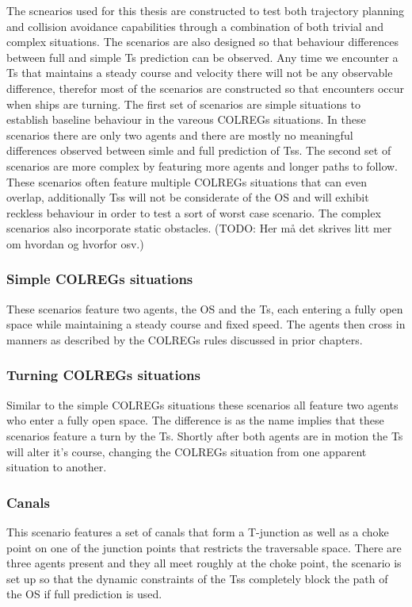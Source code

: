 The scnearios used for this thesis are constructed to test both trajectory planning and collision avoidance capabilities through
a combination of both trivial and complex situations. The scenarios are also designed so that behaviour differences between
full and simple \gls{Ts} prediction can be observed. Any time we encounter a \gls{Ts} that maintains a steady course and
velocity there will not be any observable difference, therefor most of the scenarios are constructed so that encounters occur
when ships are turning.
The first set of scenarios are simple situations to establish baseline behaviour in the vareous \gls{COLREGs} situations. In these scenarios there are only 
two agents and there are mostly no meaningful differences observed between simle and full prediction of \gls{Ts}s. 
The second set of scenarios are more complex by featuring more agents and longer paths to follow. These scenarios often feature multiple \gls{COLREGs} situations that can
even overlap, additionally \gls{Ts}s will not be considerate of the \gls{OS} and will exhibit reckless behaviour in order to test a sort of worst case scenario.
The complex scenarios also incorporate static obstacles. (TODO: Her må det skrives litt mer om hvordan og hvorfor osv.)


\subsubsection*{Simple COLREGs situations}
These scenarios feature two agents, the \gls{OS} and the \gls{Ts}, each entering a fully open space while maintaining a
steady course and fixed speed. The agents then cross in manners as described by the \gls{COLREGs} rules discussed in prior chapters.


\subsubsection*{Turning COLREGs situations}
Similar to the simple \gls{COLREGs} situations these scenarios all feature two agents who enter a fully open space. The difference
is as the name implies that these scenarios feature a turn by the \gls{Ts}. Shortly after both agents are in motion the \gls{Ts}
will alter it's course, changing the COLREGs situation from one apparent situation to another.

\subsubsection*{Canals}
This scenario features a set of canals that form a T-junction as well as a choke point on one of the junction points that restricts
the traversable space. There are three agents present and they all meet roughly at the choke point, the scenario is set up so that
the dynamic constraints of the \gls{Ts}s completely block the path of the \gls{OS} if full prediction is used.

